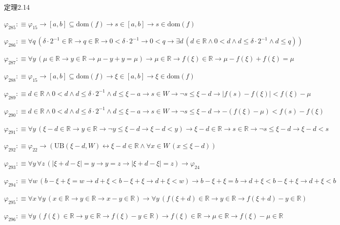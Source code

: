 \begin{fullproof}{定理2.14}
\begin{abbrevlist}
\item $\varphi_{285} :\equiv \varphi_{15} \to [a,b] \subseteq \mathrm{dom}(f) \to s \in [a,b] \to s \in \mathrm{dom}(f)$
\item $\varphi_{286} :\equiv \forall q\,(\delta \cdot 2^{-1} \in \mathbb{R} \to q \in \mathbb{R} \to 0 < \delta \cdot 2^{-1} \to 0 < q \to \exists d\,(d \in \mathbb{R} \land 0 < d \land d \leq \delta \cdot 2^{-1} \land d \leq q))$
\item $\varphi_{287} :\equiv \forall y\,(\mu \in \mathbb{R} \to y \in \mathbb{R} \to \mu - y + y = \mu) \to \mu \in \mathbb{R} \to f(\xi) \in \mathbb{R} \to \mu - f(\xi) + f(\xi) = \mu$
\item $\varphi_{288} :\equiv \varphi_{15} \to [a,b] \subseteq \mathrm{dom}(f) \to \xi \in [a,b] \to \xi \in \mathrm{dom}(f)$
\item $\varphi_{289} :\equiv d \in \mathbb{R} \land 0 < d \land d \leq \delta \cdot 2^{-1} \land d \leq \xi - a \to s \in W \to \neg s \leq \xi - d \to \lvert f(s) - f(\xi) \rvert < f(\xi) - \mu$
\item $\varphi_{290} :\equiv d \in \mathbb{R} \land 0 < d \land d \leq \delta \cdot 2^{-1} \land d \leq \xi - a \to s \in W \to \neg s \leq \xi - d \to -(f(\xi) - \mu) < f(s) - f(\xi)$
\item $\varphi_{291} :\equiv \forall y\,(\xi - d \in \mathbb{R} \to y \in \mathbb{R} \to \neg y \leq \xi - d \to \xi - d < y) \to \xi - d \in \mathbb{R} \to s \in \mathbb{R} \to \neg s \leq \xi - d \to \xi - d < s$
\item $\varphi_{292} :\equiv \varphi_{22} \to (\mathrm{UB}(\xi - d,W) \leftrightarrow \xi - d \in \mathbb{R} \land \forall x \in W\,(x \leq \xi - d))$
\item $\varphi_{293} :\equiv \forall y\,\forall z\,(\lvert \xi + d - \xi \rvert = y \to y = z \to \lvert \xi + d - \xi \rvert = z) \to \varphi_{24}$
\item $\varphi_{294} :\equiv \forall w\,(b - \xi + \xi = w \to d + \xi < b - \xi + \xi \to d + \xi < w) \to b - \xi + \xi = b \to d + \xi < b - \xi + \xi \to d + \xi < b$
\item $\varphi_{295} :\equiv \forall x\,\forall y\,(x \in \mathbb{R} \to y \in \mathbb{R} \to x - y \in \mathbb{R}) \to \forall y\,(f(\xi + d) \in \mathbb{R} \to y \in \mathbb{R} \to f(\xi + d) - y \in \mathbb{R})$
\item $\varphi_{296} :\equiv \forall y\,(f(\xi) \in \mathbb{R} \to y \in \mathbb{R} \to f(\xi) - y \in \mathbb{R}) \to f(\xi) \in \mathbb{R} \to \mu \in \mathbb{R} \to f(\xi) - \mu \in \mathbb{R}$

\end{abbrevlist}
\end{fullproof}
